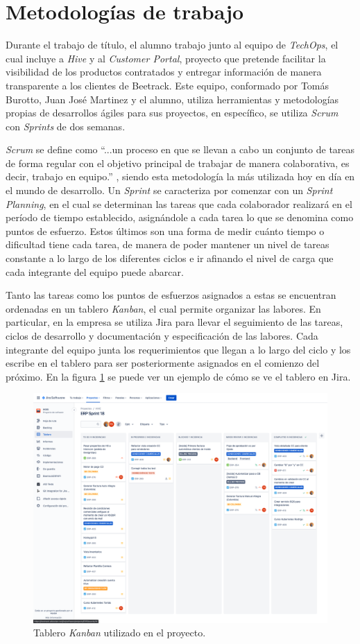 \section{Metodologías de trabajo}

    Durante el trabajo de título, el alumno trabajo junto al equipo de \textit{TechOps}, el cual incluye a \textit{Hive} y al \textit{Customer Portal}, proyecto que pretende facilitar la visibilidad de los productos contratados y entregar información de manera transparente a los clientes de Beetrack. Este equipo, conformado por Tomás Burotto, Juan José Martinez y el alumno, utiliza herramientas y metodologías propias de desarrollos ágiles para sus proyectos, en específico, se utiliza \textit{Scrum} con \textit{Sprints} de dos semanas.
    
    \textit{Scrum} se define como ``...un proceso en que se llevan a cabo un conjunto de tareas de forma regular con el objetivo principal de trabajar de manera colaborativa, es decir, trabajo en equipo.'' \cite{scrum_definition}, siendo esta metodología la más utilizada hoy en día en el mundo de desarrollo. Un \textit{Sprint} se caracteriza por comenzar con un \textit{Sprint Planning}, en el cual se determinan las tareas que cada colaborador realizará en el período de tiempo establecido, asignándole a cada tarea lo que se denomina como puntos de esfuerzo. Estos últimos son una forma de medir cuánto tiempo o dificultad tiene cada tarea, de manera de poder mantener un nivel de tareas constante a lo largo de los diferentes ciclos e ir  afinando el nivel de carga que cada integrante del equipo puede abarcar.
    
    Tanto las tareas como los puntos de esfuerzos asignados a estas se encuentran ordenadas en un tablero \textit{Kanban}, el cual permite organizar las labores. En particular, en la empresa se utiliza Jira para llevar el seguimiento de las tareas, ciclos de desarrollo y documentación y especificación de las labores. Cada integrante del equipo junta los requerimientos que llegan a lo largo del ciclo y los escribe en el tablero para ser posteriormente asignados en el comienzo del próximo. En la figura \ref{fig:kanban} se puede ver un ejemplo de cómo se ve el tablero en Jira.
    
    \begin{figure}
        \centering
        \includegraphics[width=0.75\linewidth]{figures/jira.png}
        \caption{Tablero \textit{Kanban} utilizado en el proyecto.}
        \label{fig:kanban}
    \end{figure}
    
